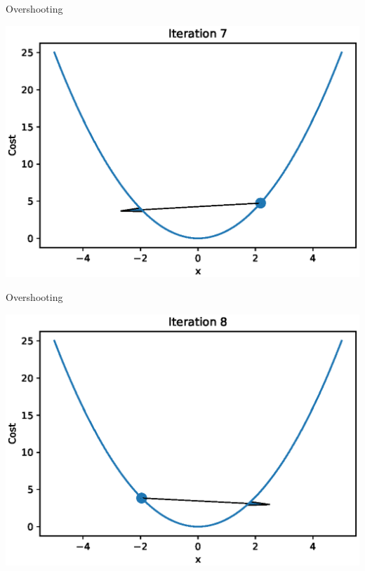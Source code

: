 \documentclass{beamer}
\begin{document}
\begin{frame}{Overshooting}
  \begin{center}
       \includegraphics[totalheight=6cm]{gradient-descent/overshooting-7.eps}
   \end{center}
\end{frame}

\begin{frame}{Overshooting}
  \begin{center}
       \includegraphics[totalheight=6cm]{gradient-descent/overshooting-8.eps}
   \end{center}
\end{frame}
\end{document}
